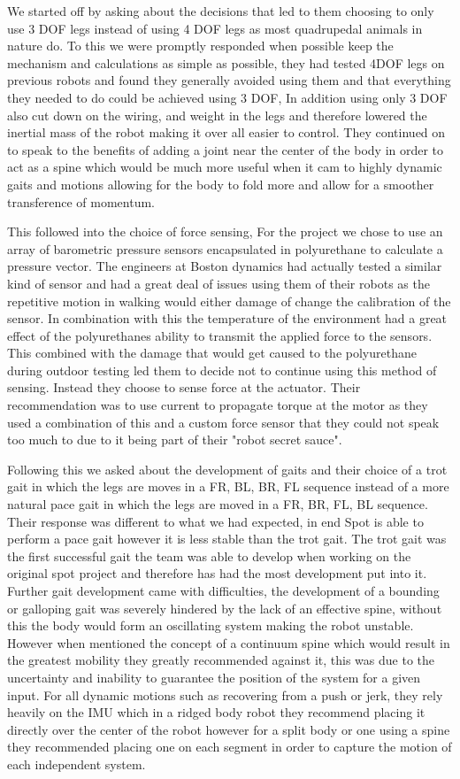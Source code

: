 We started off by asking about the decisions that led to them choosing to only use 3 DOF legs instead of using 4 DOF legs as most quadrupedal animals in nature do. To this we were promptly responded when possible keep the mechanism and calculations as simple as possible, they had tested 4DOF legs on previous robots and found they generally avoided using them and that everything they needed to do could be achieved using 3 DOF, In addition using only 3 DOF also cut down on the wiring, and weight in the legs and therefore lowered the inertial mass of the robot making it over all easier to control. They continued on to speak to the benefits of adding a joint near the center of the body in order to act as a spine which would be much more useful when it cam to highly dynamic gaits and motions allowing for the body to fold more and allow for a smoother transference of momentum.

This followed into the choice of force sensing, For the project we chose to use an array of barometric pressure sensors encapsulated in polyurethane to calculate a pressure vector. The engineers at Boston dynamics had actually tested a similar kind of sensor and had a great deal of issues using them of their robots as the repetitive motion in walking would either damage of change the calibration of the sensor. In combination with this the temperature of the environment had a great effect of the polyurethanes ability to transmit the applied force to the sensors. This combined with the damage that would get caused to the polyurethane during outdoor testing led them to decide not to continue using this method of sensing. Instead they choose to sense force at the actuator. Their recommendation was to use current to propagate torque at the motor as they used a combination of this and a custom force sensor that they could not speak too much to due to it being part of their "robot secret sauce". 

Following this we asked about the development of gaits and their choice of a trot gait in which the legs are moves in a FR, BL, BR, FL sequence instead of a more natural pace gait in which the legs are moved in a FR, BR, FL, BL sequence. Their response was different to what we had expected, in end Spot is able to perform a pace gait however it is less stable than the trot gait. The trot gait was the first successful gait the team was able to develop when working on the original spot project and therefore has had the most development put into it. Further gait development came with difficulties, the development of a bounding or galloping gait was severely hindered by the lack of an effective spine, without this the body would form an oscillating system making the robot unstable. However when mentioned the concept of a continuum spine which would result in the greatest mobility they greatly recommended against it, this was due to the uncertainty and inability to guarantee the position of the system for a given input. For all dynamic motions such as recovering from a push or jerk, they rely heavily on the IMU which in a ridged body robot they recommend placing it directly over the center of the robot however for a split body or one using a spine they recommended placing one on each segment in order to capture the motion of each independent system. 

